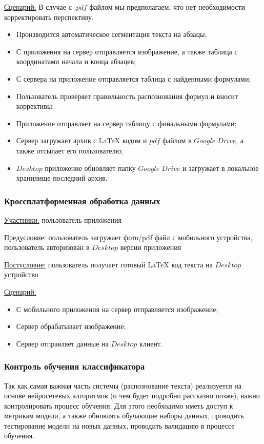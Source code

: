 \underline{Сценарий:}
В случае с $.pdf$ файлом мы предполагаем, что нет необходимости корректировать перспективу.
\begin{itemize}
    \item Производится автоматическое сегментация текста на абзацы;
    \item С приложения на сервер отправляется изображение, а также таблица с координатами начала и конца абзацев;
    \item С сервера на приложение отправляется таблица с найденными формулами;
    \item Пользователь проверяет правильность распознования формул и вносит коррективы;
    \item Приложение отправляет на сервер таблицу с финальными формулами;
    \item Сервер загружает архив с \LaTeX\; кодом и $pdf$ файлом в $Google\;Drive$, а также отсылает его пользователю;
    \item $Desktop$ приложение обновляет папку $Google\;Drive$ и загружает в локальное хранилище последний архив.
\end{itemize}

\subsubsection{Кроссплатформенная обработка данных}
\underline{Участники:} пользователь приложения

\underline{Предусловие:} пользователь загружает фото/pdf файл с мобильного устройства, пользователь авторизован в $Desktop$ версии приложения

\underline{Постусловие:} пользователь получает готовый \LaTeX\; код текста на $Desktop$ устройство

\underline{Сценарий:}
\begin{itemize}
    \item С мобильного приложения на сервер отправляется изображение;
    \item Сервер обрабатывает изображение;
    \item Сервер отправляет данные на $Desktop$ клиент.
\end{itemize}

\subsubsection{Контроль обучения классификатора}

Так как самая важная часть системы (распознование текста) реализуется на основе нейросетевых алгоритмов (о чем будет подробно рассказно позже), важно контролировать процесс обучения.
Для этого необходимо иметь доступ к метрикам модели, а также обновлять обучающие наборы данных, проводить тестирование модели на новых данных, проводить валидацию в процессе обучения.

